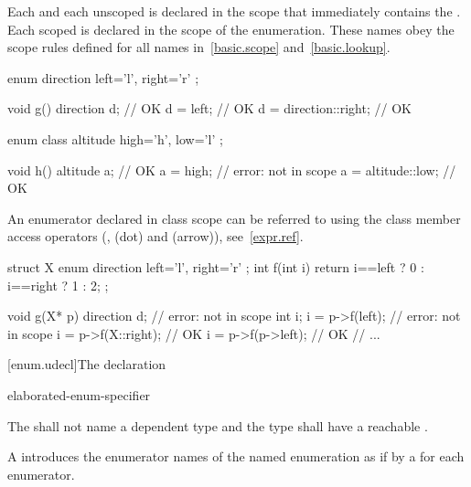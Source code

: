 \pnum
{}%
Each  and each unscoped  is
declared in the scope that immediately contains the .
Each scoped  is declared in the scope of the
enumeration.
These names obey the scope rules defined for all names
in~\ref{basic.scope} and~\ref{basic.lookup}.
\begin{example}
\begin{codeblock}
enum direction { left='l', right='r' };

void g()  {
  direction d;                  // OK
  d = left;                     // OK
  d = direction::right;         // OK
}

enum class altitude { high='h', low='l' };

void h()  {
  altitude a;                   // OK
  a = high;                     // error:  not in scope
  a = altitude::low;            // OK
}
\end{codeblock}
\end{example}
%
An enumerator declared in class scope can be referred to using the class
member access operators (\tcode{::},  (dot) and \tcode{->}
(arrow)), see~\ref{expr.ref}.
\begin{example}
\begin{codeblock}
struct X {
  enum direction { left='l', right='r' };
  int f(int i) { return i==left ? 0 : i==right ? 1 : 2; }
};

void g(X* p) {
  direction d;                  // error:  not in scope
  int i;
  i = p->f(left);               // error:  not in scope
  i = p->f(X::right);           // OK
  i = p->f(p->left);            // OK
  // ...
}
\end{codeblock}
\end{example}

[enum.udecl]{The  declaration}%
%

\begin{bnf}
\br
     elaborated-enum-specifier \terminal{;}
\end{bnf}

\pnum
The 
shall not name a dependent type
and the type shall have a reachable .

\pnum
A 
introduces the enumerator names of the named enumeration
as if by a  for each enumerator.

